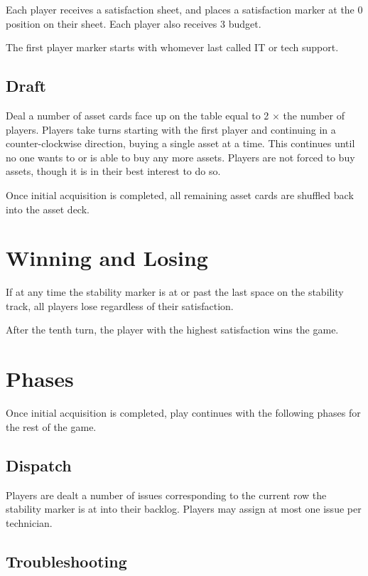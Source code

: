 \documentclass[twocolumn]{article}
\begin{document}
Each player receives a satisfaction sheet, and places a satisfaction marker at the 0 position on their sheet. Each player also receives 3 budget.

The first player marker starts with whomever last called IT or tech support.

\subsection*{Draft}

Deal a number of asset cards face up on the table equal to 2 $\times$ the number of players. Players take turns starting with the first player and continuing in a counter-clockwise direction, buying a single asset at a time. This continues until no one wants to or is able to buy any more assets. Players are not forced to buy assets, though it is in their best interest to do so.

Once initial acquisition is completed, all remaining asset cards are shuffled back into the asset deck.

\section*{Winning and Losing}

If at any time the stability marker is at or past the last space on the stability track, all players lose regardless of their satisfaction.

After the tenth turn, the player with the highest satisfaction wins the game.

\pagebreak

\section*{Phases}

Once initial acquisition is completed, play continues with the following phases for the rest of the game.

\subsection*{Dispatch}

Players are dealt a number of issues corresponding to the current row the stability marker is at into their backlog. Players may assign at most one issue per technician.

\subsection*{Troubleshooting}
\end{document}
